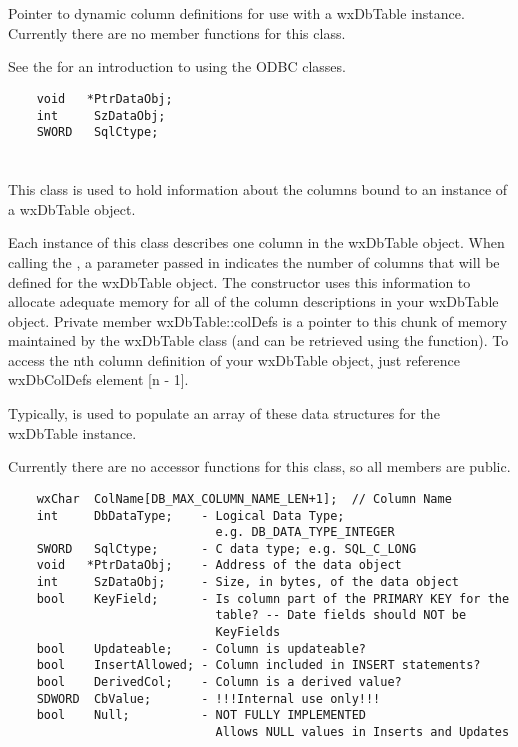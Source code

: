 \section{}\label{wxdbcoldataptr}

Pointer to dynamic column definitions for use with a wxDbTable instance.
Currently there are no member functions for this class.

See the  for
an introduction to using the ODBC classes.

\begin{verbatim}
    void   *PtrDataObj;
    int     SzDataObj;
    SWORD   SqlCtype;
\end{verbatim}

\section{}\label{wxdbcoldef}

This class is used to hold information about the columns bound to an
instance of a wxDbTable object.

Each instance of this class describes one column in the wxDbTable
object.  When calling the , a
parameter passed in indicates the number of columns that will be defined for
the wxDbTable object.  The constructor uses this information to allocate
adequate memory for all of the column descriptions in your wxDbTable object.
Private member wxDbTable::colDefs is a pointer to this chunk of memory
maintained by the wxDbTable class (and can be retrieved using the
 function).
To access the nth column definition of your wxDbTable object, just reference
wxDbColDefs element [n - 1].

Typically,  is used to
populate an array of these data structures for the wxDbTable instance.

Currently there are no accessor functions for this class, so all members are
public.

\begin{verbatim}
    wxChar  ColName[DB_MAX_COLUMN_NAME_LEN+1];  // Column Name
    int     DbDataType;    - Logical Data Type;
                             e.g. DB_DATA_TYPE_INTEGER
    SWORD   SqlCtype;      - C data type; e.g. SQL_C_LONG
    void   *PtrDataObj;    - Address of the data object
    int     SzDataObj;     - Size, in bytes, of the data object
    bool    KeyField;      - Is column part of the PRIMARY KEY for the
                             table? -- Date fields should NOT be
                             KeyFields
    bool    Updateable;    - Column is updateable?
    bool    InsertAllowed; - Column included in INSERT statements?
    bool    DerivedCol;    - Column is a derived value?
    SDWORD  CbValue;       - !!!Internal use only!!!
    bool    Null;          - NOT FULLY IMPLEMENTED
                             Allows NULL values in Inserts and Updates
\end{verbatim}

